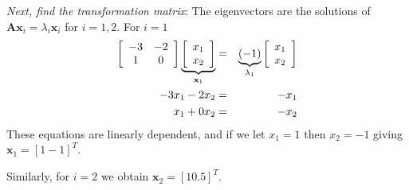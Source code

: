 \emph{Next, find the transformation matrix}: The eigenvectors are the solutions of $\mathbf{A}\mathbf{x}_i=\lambda_i\mathbf{x}_i$ for $i=1,2$. For $i=1$
\begin{eqnarray*}
 \left[ {\begin{array}{*{20}c}
   { - 3} & { - 2}  \\
   1 & 0  \\
\end{array}} \right]\underbrace {\left[ {\begin{array}{*{20}c}
   {x_1 }  \\
   {x_2 }  \\
\end{array}} \right]}_{{\bf{x}}_1 } & = & \underbrace {( - 1)}_{\lambda _1 }\left[ {\begin{array}{*{20}c}
   {x_1 }  \\
   {x_2 }  \\
\end{array}} \right] \\ 
  - 3x_1  - 2x_2  & = &  - x_1  \\ 
 x_1  + 0x_2  & = &  - x_2  \\ 
 \end{eqnarray*}
These equations are linearly dependent, and if we let $x_1 =1$ then $x_2 = -1$ giving $\mathbf{x}_1=[1 -1]^T$.

Similarly, for $i=2$ we obtain $\mathbf{x}_2=[1 0.5]^T$. 

